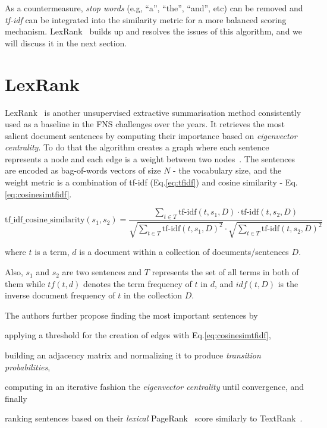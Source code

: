 As a countermeasure, \emph{stop words} (e.g, ``a'', ``the'', ``and'', etc) can be removed and \emph{tf-idf} can be integrated into the similarity metric for a more balanced scoring mechanism.
LexRank~\cite{Erkan2004LexRankGC} builds up and resolves the issues of this algorithm, and we will discuss it in the next section.


\section{LexRank}\label{sec:lexrank}
LexRank~\cite{Erkan2004LexRankGC} is another unsupervised extractive summarisation method consistently used as a baseline in the FNS challenges over the years.
It retrieves the most salient document sentences by computing their importance based on \emph{eigenvector centrality}.
To do that the algorithm creates a graph where each sentence represents a node and each edge is a weight between two nodes~\cite{Shearing2020AutomatedTS}.
The sentences are encoded as bag-of-words vectors of size $N$ - the vocabulary size, and the weight metric is a combination of tf-idf (Eq.\ref{eq:tfidf}) and cosine similarity - Eq.\ref{eq:cosinesimtfidf}.

\begin{equation}
    \text{tf\_idf\_cosine\_similarity}(s_1, s_2) = \frac{\sum_{t \in T} \text{tf-idf}(t, s_1, D) \cdot \text{tf-idf}(t, s_2, D)}{ \sqrt{\sum_{t \in T} \text{tf-idf}(t, s_1, D)^2} \cdot \sqrt{\sum_{t \in T} \text{tf-idf}(t, s_2, D)^2}}
    \label{eq:cosinesimtfidf}
\end{equation}

where $t$ is a term, $d$ is a document within a collection of documents/sentences $D$.

Also, $s_1$ and $s_2$ are two sentences and $T$ represents the set of all terms in both of them while $tf(t, d)$ denotes the term frequency of $t$ in $d$, and $idf(t, D)$ is the inverse document frequency of $t$ in the collection $D$.

The authors further propose finding the most important sentences by \begin{enumerate*}
    \item applying a threshold for the creation of edges with Eq.\ref{eq:cosinesimtfidf},
    \item building an adjacency matrix and normalizing it to produce \emph{transition probabilities},
    \item computing in an iterative fashion the \emph{eigenvector centrality} until convergence, and finally
    \item ranking sentences based on their \emph{lexical} PageRank~\cite{page1998anatomy} score similarly to TextRank~\cite{mihalcea-tarau-2004-textrank}.
\end{enumerate*}


